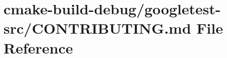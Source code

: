 \hypertarget{cmake-build-debug_2googletest-src_2CONTRIBUTING_8md}{}\section{cmake-\/build-\/debug/googletest-\/src/\+C\+O\+N\+T\+R\+I\+B\+U\+T\+I\+NG.md File Reference}
\label{cmake-build-debug_2googletest-src_2CONTRIBUTING_8md}
